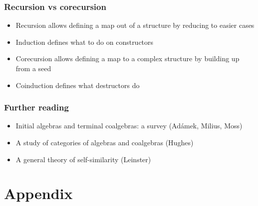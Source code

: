 \documentclass{beamer}
\begin{document}
\begin{frame}
  \frametitle{Recursion vs corecursion}
  \begin{itemize}
    \item Recursion allows defining a map out of a structure by reducing to easier cases
    \item Induction defines what to do on constructors
    \item Corecursion allows defining a map to a complex structure by building up from a seed
    \item Coinduction defines what destructors do
  \end{itemize}
\end{frame}
\begin{frame}
  \frametitle{Further reading}
  \begin{itemize}
    \item Initial algebras and terminal coalgebras: a survey (Ad\'amek, Milius, Moss)
    \item A study of categories of algebras and coalgebras (Hughes)
    \item A general theory of self-similarity (Leinster)
  \end{itemize}
\end{frame}
\appendix
\section{Appendix}
\end{document}

